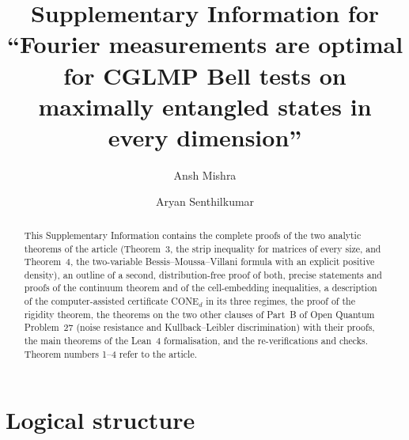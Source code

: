 \documentclass[11pt]{amsart}
\theoremstyle{definition}
\theoremstyle{remark}
\numberwithin{equation}{section}
\begin{document}
\title[Supplementary Information]{Supplementary Information for\\ ``Fourier measurements are optimal for CGLMP Bell
tests on maximally entangled states in every dimension''}

\author{Ansh Mishra}
\address{Independent researcher, Cumming, GA, USA}
\author{Aryan Senthilkumar}
\address{Independent researcher, Johns Creek, GA, USA}


\begin{abstract}
This Supplementary Information contains the complete proofs of the two analytic theorems of the article
(Theorem~3, the strip inequality for matrices of every size, and Theorem~4, the two-variable
Bessis--Moussa--Villani formula with an explicit positive density), an outline of a second, distribution-free proof of
both, precise statements and proofs of the continuum theorem and of the cell-embedding inequalities, a description of
the computer-assisted certificate CONE$_d$ in its three regimes, the proof of the rigidity theorem, the theorems on the
two other clauses of Part~B of Open Quantum Problem~27 (noise resistance and Kullback--Leibler discrimination) with
their proofs, the main theorems of the Lean~4 formalisation, and the re-verifications and checks. Theorem
numbers 1--4 refer to the article.
\end{abstract}

\maketitle

\tableofcontents

\section{Logical structure}\label{sec:structure}
\end{document}
